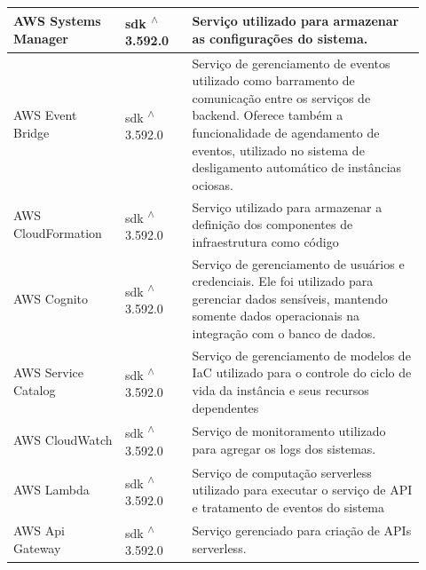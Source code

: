 \begin{longtable}{p{0.25\linewidth} p{0.15\linewidth} p{0.525\linewidth}}
AWS Systems Manager \citep{awssystemsmanagerdocs} & sdk \textsuperscript{$\wedge$}3.592.0 & Serviço utilizado para armazenar as configurações do sistema. \\

\hline

AWS Event Bridge \citep{awseventbridgedocs} & sdk \textsuperscript{$\wedge$}3.592.0 & Serviço de gerenciamento de eventos utilizado como barramento de comunicação entre os serviços de backend. Oferece também a funcionalidade de agendamento de eventos, utilizado no sistema de desligamento automático de instâncias ociosas. \\

\hline

AWS CloudFormation \citep{awscloudformationdocs} & sdk \textsuperscript{$\wedge$}3.592.0 & Serviço utilizado para armazenar a definição dos componentes de infraestrutura como código \\

\hline

AWS Cognito \citep{awscognito} & sdk \textsuperscript{$\wedge$}3.592.0 & Serviço de gerenciamento de usuários e credenciais. Ele foi utilizado para gerenciar dados sensíveis, mantendo somente dados operacionais na integração com o banco de dados. \\

\hline

AWS Service Catalog \citep{awsservicecatalogdocs} & sdk \textsuperscript{$\wedge$}3.592.0 & Serviço de gerenciamento de modelos de IaC utilizado para o controle do ciclo de vida da instância e seus recursos dependentes \\

\hline

AWS CloudWatch \citep{awscloudwatchdocs} & sdk \textsuperscript{$\wedge$}3.592.0 & Serviço de monitoramento utilizado para agregar os logs dos sistemas. \\

\hline

AWS Lambda \citep{awslambdadocs} & sdk \textsuperscript{$\wedge$}3.592.0 & Serviço de computação serverless utilizado para executar o serviço de API e tratamento de eventos do sistema \\

\hline

AWS Api Gateway \citep{awsapigatewaydocs} & sdk \textsuperscript{$\wedge$}3.592.0 & Serviço gerenciado para criação de APIs serverless. \\


\end{longtable}

